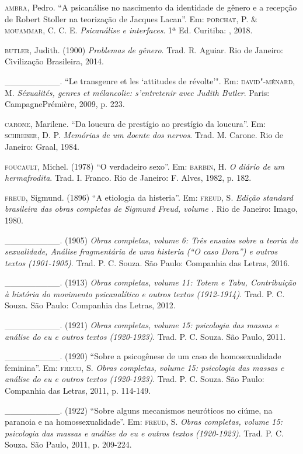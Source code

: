 \begin{Parskip}
\textsc{ambra}, Pedro. ``A psicanálise no nascimento da identidade de gênero e a
recepção de Robert Stoller na teorização de Jacques Lacan''. Em: \textsc{porchat},
P. \& \textsc{mouammar}, C. C. E. \emph{Psicanálise e interfaces}. 1ª Ed.
Curitiba: , 2018.

\textsc{butler}, Judith. (1900) \emph{Problemas de gênero}. Trad. R. Aguiar.
Rio de Janeiro: Civilização Brasileira, 2014. 

\_\_\_\_\_\_\_\_\_. ``Le transgenre et les `attitudes de révolte'". Em: \textsc{david"-ménard}, M. \emph{Séxualités, genres et mélancolie: s'entretenir avec
Judith Butler}. Paris: CampagnePrémière, 2009, p. 223.

\textsc{carone}, Marilene. ``Da loucura de prestígio ao prestígio da loucura''. Em:
\textsc{schreber}, D. P. \emph{Memórias de um doente dos nervos}. Trad. M. Carone.
Rio de Janeiro: Graal, 1984.

\textsc{foucault}, Michel. (1978) ``O verdadeiro sexo''. Em: \textsc{barbin}, H. \emph{O
diário de um hermafrodita}. Trad. I. Franco. Rio de Janeiro: F. Alves, 1982, p. 182.

\textsc{freud}, Sigmund. (1896) ``A etiologia da histeria''. Em: \textsc{freud}, S.
\emph{Edição standard brasileira das obras completas de Sigmund Freud,
volume .} Rio de Janeiro: Imago, 1980.

\_\_\_\_\_\_\_\_\_. (1905) \emph{Obras completas, volume 6: Três ensaios
sobre a teoria da sexualidade, Análise fragmentária de uma histeria (``O
caso Dora'') e outros textos (1901-1905)}. Trad. P. C. Souza. São Paulo: Companhia das Letras, 2016.  

\_\_\_\_\_\_\_\_\_. (1913) \emph{Obras completas,
volume 11: Totem e Tabu, Contribuição à história do movimento
psicanalítico e outros textos (1912-1914)}. Trad. P. C. Souza. São Paulo: Companhia das Letras, 2012.

\_\_\_\_\_\_\_\_\_. (1921) \emph{Obras completas, volume 15: psicologia das massas e análise
do eu e outros textos (1920-1923)}. Trad. P. C. Souza. São Paulo, 2011. 

\_\_\_\_\_\_\_\_\_. (1920) ``Sobre a psicogênese de um caso de homosexualidade
feminina''. Em: \textsc{freud}, S. \emph{Obras completas, volume 15: psicologia das
massas e análise do eu e outros textos (1920-1923)}. Trad. P. C. Souza.
São Paulo: Companhia das Letras, 2011, p. 114-149. 

\_\_\_\_\_\_\_\_\_. (1922) ``Sobre alguns mecanismos neuróticos no ciúme, na
paranoia e na homossexualidade''. Em: \textsc{freud}, S. \emph{Obras completas,
volume 15: psicologia das massas e análise do eu e outros textos
(1920-1923)}. Trad. P. C. Souza. São Paulo, 2011, p. 209-224.


\end{Parskip}
